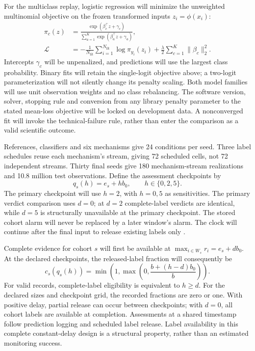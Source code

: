 \documentclass[11pt,a4paper]{article}
\begin{document}
For the multiclass replay, logistic regression will minimize the unweighted
multinomial objective on the frozen transformed inputs $z_i=\phi(x_i)$:
\begin{align}
\pi_c(z)&=\frac{\exp(\beta_c^\top z+\gamma_c)}
 {\sum_{a=1}^{K}\exp(\beta_a^\top z+\gamma_a)},\\
\mathcal L&=-\frac{1}{N_{\mathrm{fit}}}
 \sum_{i=1}^{N_{\mathrm{fit}}}\log\pi_{y_i}(z_i)
 +\frac{\lambda}{2}\sum_{c=1}^{K}\|\beta_c\|_2^2.
\end{align}
Intercepts $\gamma_c$ will be unpenalized, and predictions will use the largest
class probability. Binary fits will retain the single-logit objective above;
a two-logit parameterization will not silently change its penalty scaling.
Both model families will use unit observation weights and no class rebalancing.
The software version, solver, stopping rule and conversion from any library
penalty parameter to the stated mean-loss objective will be locked on
development data. A nonconverged fit will invoke the technical-failure rule,
rather than enter the comparison as a valid scientific outcome.

References, classifiers and six mechanisms give 24 conditions per seed. Three
label schedules reuse each mechanism's stream, giving 72 scheduled cells, not
72 independent streams. Thirty final seeds give 180 mechanism-stream realizations
and 10.8 million test observations. Define the assessment checkpoints by
\begin{equation}
q_s(h)=e_s+hb_0,\qquad h\in\{0,2,5\}.
\end{equation}
The primary checkpoint will use $h=2$, with $h=0,5$ as sensitivities. The primary
verdict comparison uses $d=0$; at $d=2$ complete-label verdicts are identical,
while $d=5$ is structurally unavailable at the primary checkpoint. The stored
cohort alarm will never be replaced by a later window's alarm. The clock will
continue after the final input to release existing labels only
\cite{souza,alencar}.

Complete evidence for cohort $s$ will first be available at
$\max_{i\in W_s}r_i=e_s+db_0$. At the declared checkpoints, the released-label
fraction will consequently be
\begin{equation}
c_s(q_s(h))=\min\!\left(1,\max\!\left(0,
 \frac{b+(h-d)b_0}{b}\right)\right).
\end{equation}
For valid records, complete-label eligibility is equivalent to $h\geq d$.
For the declared sizes and checkpoint grid, the recorded fractions are zero
or one. With positive delay, partial release can occur between checkpoints;
with $d=0$, all cohort labels are available at completion. Assessments at a
shared timestamp follow prediction logging and scheduled label release.
Label availability in this complete constant-delay
design is a structural property, rather than an estimated monitoring success.
\end{document}
